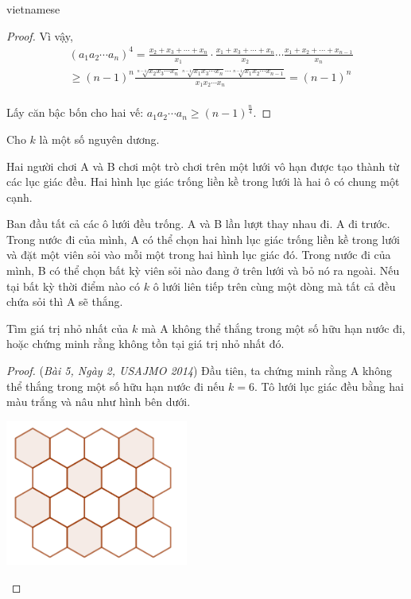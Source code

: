 \documentclass{article}
\begin{document}
\begin{otherlanguage*}{vietnamese}
\begin{proof}
    Vì vậy,
    \[
        \begin{aligned}
            &(a_1 a_2 \cdots a_n) ^ 4 = \frac{x_2 + x_3 + \cdots + x_n}{x_1} \cdot \frac{x_1 + x_3 + \cdots + x_n}{x_2} \cdots \frac{x_1 + x_2 + \cdots + x_{n-1}}{x_n}\\
            &\ge (n-1)^n \frac{\sqrt[n-1]{x_2x_3 \cdots x_n}\sqrt[n-1]{x_1x_3 \cdots x_n} \cdots \sqrt[n-1]{x_1x_2 \cdots x_{n-1}}}{x_1x_2 \cdots x_n}
            = (n-1)^n\\
        \end{aligned}
    \]

    Lấy căn bậc bốn cho hai vế: $\boxed{a_1 a_2 \cdots a_n \ge (n-1)^{\frac{n}{4}}.}$
\end{proof}

\newpage

\begin{example*}[Bài 3]
    Cho $k$ là một số nguyên dương.

    Hai người chơi A và B chơi một trò chơi trên một lưới vô hạn được tạo thành từ các lục giác đều.
    Hai hình lục giác trống liền kề trong lưới là hai ô có chung một cạnh. 

    Ban đầu tất cả các ô lưới đều trống. A và B lần lượt thay nhau đi. A đi trước.
    Trong nước đi của mình, A có thể chọn hai hình lục giác trống liền kề trong lưới và đặt một viên sỏi vào mỗi một trong hai hình lục giác đó.
    Trong nước đi của mình, B có thể chọn bất kỳ viên sỏi nào đang ở trên lưới và bỏ nó ra ngoài.
    Nếu tại bất kỳ thời điểm nào có $k$ ô lưới liên tiếp trên cùng một dòng mà tất cả đều chứa sỏi thì A sẽ thắng.
    
    Tìm giá trị nhỏ nhất của $k$ mà A không thể thắng trong một số hữu hạn nước đi, hoặc chứng minh rằng không tồn tại giá trị nhỏ nhất đó.
\end{example*}

\begin{proof} (\textit{Bài 5, Ngày 2, USAJMO 2014})
    Đầu tiên, ta chứng minh rằng A  không thể thắng trong một số hữu hạn nước đi nếu $k=6.$
    Tô lưới lục giác đều bằng hai màu trắng và nâu như hình bên dưới.

    \begin{center}
        \includegraphics[width=6cm]{./svg/pdf/pi-2024-1-p3.pdf}
    \end{center}


\end{proof}
\end{otherlanguage*}
\end{document}
